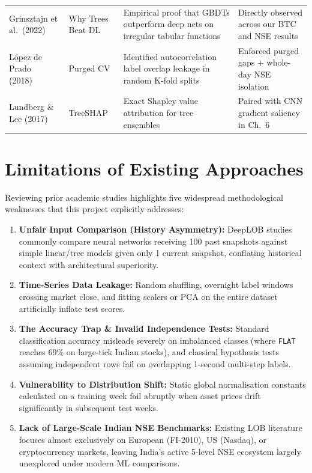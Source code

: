 \documentclass[12pt,a4paper,oneside]{report}
\newcommand{\code}[1]{\texttt{#1}}
\begin{document}
\begin{table}[H]
\begin{tabularx}{\linewidth}{@{}>{\raggedright\arraybackslash}p{3.0cm}>{\raggedright\arraybackslash}p{2.3cm}>{\raggedright\arraybackslash}X>{\raggedright\arraybackslash}X@{}}
Grinsztajn et al.\ (2022)~\cite{grinsztajn2022} & Why Trees Beat DL & Empirical proof that GBDTs outperform deep nets on irregular tabular functions & Directly observed across our BTC and NSE results \\
L\'opez de Prado (2018)~\cite{lopez2018} & Purged CV & Identified autocorrelation label overlap leakage in random K-fold splits & Enforced purged gaps + whole-day NSE isolation \\
Lundberg \& Lee (2017)~\cite{lundberg2017} & TreeSHAP & Exact Shapley value attribution for tree ensembles & Paired with CNN gradient saliency in Ch.\ 6 \\
\bottomrule
\end{tabularx}
\end{table}

\section{Limitations of Existing Approaches}

Reviewing prior academic studies highlights five widespread methodological weaknesses that this project explicitly addresses:
\begin{enumerate}
  \item \textbf{Unfair Input Comparison (History Asymmetry):} DeepLOB studies commonly compare neural networks receiving 100 past snapshots against simple linear/tree models given only 1 current snapshot, conflating historical context with architectural superiority.
  \item \textbf{Time-Series Data Leakage:} Random shuffling, overnight label windows crossing market close, and fitting scalers or PCA on the entire dataset artificially inflate test scores.
  \item \textbf{The Accuracy Trap \& Invalid Independence Tests:} Standard classification accuracy misleads severely on imbalanced classes (where \code{FLAT} reaches 69\% on large-tick Indian stocks), and classical hypothesis tests assuming independent rows fail on overlapping 1-second multi-step labels.
  \item \textbf{Vulnerability to Distribution Shift:} Static global normalisation constants calculated on a training week fail abruptly when asset prices drift significantly in subsequent test weeks.
  \item \textbf{Lack of Large-Scale Indian NSE Benchmarks:} Existing LOB literature focuses almost exclusively on European (FI-2010), US (Nasdaq), or cryptocurrency markets, leaving India's active 5-level NSE ecosystem largely unexplored under modern ML comparisons.
\end{enumerate}
\end{document}

